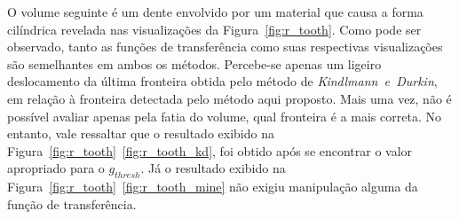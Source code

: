 	O volume seguinte é um dente envolvido por um material que causa a forma cilíndrica revelada nas visualizações da Figura~\ref{fig:r_tooth}. Como pode ser observado, tanto as funções de transferência como suas respectivas visualizações são semelhantes em ambos os métodos. Percebe-se apenas um ligeiro deslocamento da última fronteira obtida pelo método de \textit{Kindlmann~e~Durkin}, em relação à fronteira detectada  pelo método aqui proposto. Mais uma vez, não é possível avaliar apenas pela fatia do volume, qual fronteira é a mais correta. No entanto, vale ressaltar que o resultado exibido na Figura~\ref{fig:r_tooth}~\ref{fig:r_tooth_kd}, foi obtido após se encontrar o valor apropriado para o $ g_{thresh} $. Já o resultado exibido na Figura~\ref{fig:r_tooth}~\ref{fig:r_tooth_mine} não exigiu manipulação alguma da função de transferência.
	

